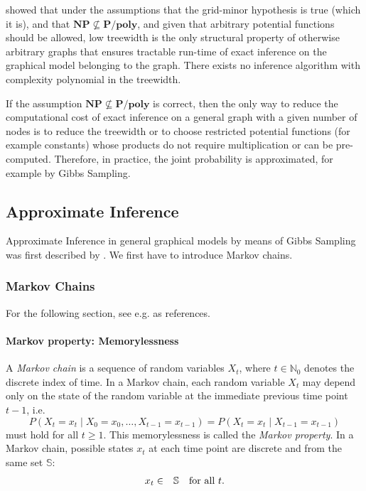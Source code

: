 \cite{ChandrasekaranHarsha2012} showed that under the assumptions
that the grid-minor hypothesis is true (which it is), and that $\mathbf{NP}\nsubseteq\mathbf{P/poly}$,
and given that arbitrary potential functions should be allowed, low
treewidth is the only structural property of otherwise arbitrary graphs
that ensures tractable run-time of exact inference on the graphical
model belonging to the graph. There exists no inference algorithm
with complexity polynomial in the treewidth.

If the assumption $\mathbf{NP}\nsubseteq\mathbf{P/poly}$ is correct,
then the only way to reduce the computational cost of exact inference
on a general graph with a given number of nodes is to reduce the
treewidth or to choose restricted potential functions (for example
constants) whose products do not require multiplication or can be
pre-computed. Therefore, in practice, the joint probability is approximated,
for example by Gibbs Sampling.

\subsection{Approximate Inference}

Approximate Inference in general graphical models by means of Gibbs
Sampling was first described by \cite{Neal1993}. We first have to
introduce Markov chains.

\subsubsection{Markov Chains}

For the following section, see e.g. \cite{Norris1997,GrinsteadSnell2003}
as references.


\paragraph{Markov property: Memorylessness}

A \emph{Markov chain} is a sequence of random
variables $X_{t}$, where $t\in\mathbb{N}_{0}$ denotes the discrete
index of time. In a Markov chain, each random variable $X_{t}$ may
depend only on the state of the random variable at the immediate previous
time point $t-1$, i.e. 
\[
P(X_{t}=x_{t}\mid X_{0}=x_{0},\dots,X_{t-1}=x_{t-1})=P(X_{t}=x_{t}\mid X_{t-1}=x_{t-1})
\]
must hold for all $t\geq1$. This memorylessness is called the \emph{Markov
property}. In a Markov chain, possible states
$x_{t}$ at each time point are discrete and from the same set $\mathbb{S}$:
\begin{eqnarray*}
x_{t} & \in & \mathbb{S}\ \ \ \mbox{for all \ensuremath{t}}.
\end{eqnarray*}

